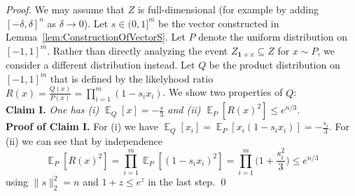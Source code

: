 \documentclass[12pt,english]{article}
\theoremstyle{theorem}
\theoremstyle{remark}
\newcommand{\E}{\mathop{\mathbb{E}}}
\begin{document}
\iffalse
\begin{proof}
  We may assume that $Z$ is full-dimensional (for example by adding $[-\delta,\delta]^n$ as $\delta \to 0$).
  Let $s \in (0,1]^m$ be the vector constructed in Lemma~\ref{lem:ConstructionOfVectorS}. Let $P$ denote the uniform distribution on $[-1,1]^m$. Rather than directly analyzing the event $Z_{\bm{1}+x} \subseteq Z$ for $x \sim P$, we consider a different distribution instead.  Let $Q$ be the product distribution on $[-1,1]^m$ that is defined by the likelyhood ratio $R(x) = \frac{Q(x)}{P(x)} = \prod_{i=1}^m (1-s_ix_i)$. We show two properties of $Q$: \\
  {\bf Claim I.} \emph{One has (i) $\E_Q[x] = -\frac{s}{3}$ and (ii) $\E_P[R(x)^2] \leq e^{n/3}$.} \\
  {\bf Proof of Claim I.} For (i) we have $\E_Q[x_i] = \E_P[x_i(1-s_ix_i)] = -\frac{s_i}{3}$. For (ii) we can see that by independence
  \[
 \E_P[R(x)^2] = \prod_{i=1}^m \E_{P}[ (1-s_ix_i)^2] = \prod_{i=1}^m \Big(1+\frac{s_i^2}{3}\Big) \leq e^{n/3}
  \]
  using $\|s\|_2^2 = n$ and $1+z \leq e^z$ in the last step. \qed


\end{proof}
\end{document}
